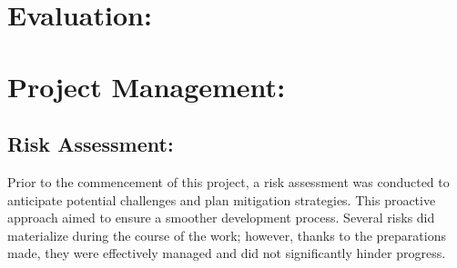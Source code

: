 \documentclass{article}
\begin{document}
\section{Evaluation:}


 



\section{Project Management: }


\subsection{Risk Assessment: }


Prior to the commencement of this project, a risk assessment was conducted to anticipate potential challenges and plan mitigation strategies. This proactive approach aimed to ensure a smoother development process. Several risks did materialize during the course of the work; however, thanks to the preparations made, they were effectively managed and did not significantly hinder progress.\\
\end{document}
